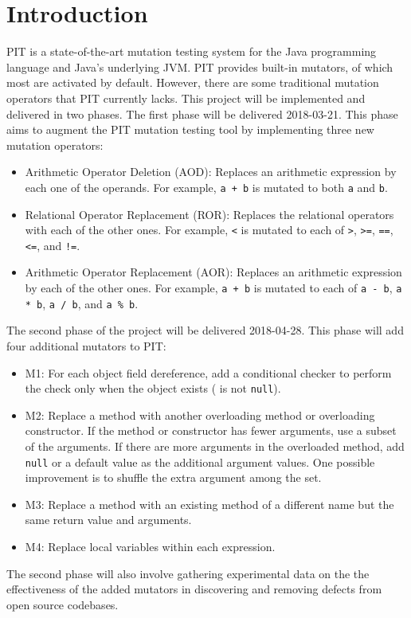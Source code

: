 \section{Introduction}

PIT is a state-of-the-art mutation testing system for the Java programming language and Java’s underlying JVM.
PIT provides built-in mutators, of which most are activated by default.
However, there are some traditional mutation operators that PIT currently lacks.
This project will be implemented and delivered in two phases.
The first phase will be delivered 2018-03-21.
This phase aims to augment the PIT mutation testing tool by implementing three new mutation operators:
\begin{itemize}
\item
  Arithmetic Operator Deletion (AOD):
  Replaces an arithmetic expression by each one of the operands.
  For example, \texttt{a + b} is mutated to both \texttt{a} and \texttt{b}.
\item
  Relational Operator Replacement (ROR):
  Replaces the relational operators with each of the other ones.
  For example, \texttt{<} is mutated to each of \texttt{>}, \texttt{>=}, \texttt{==}, \texttt{<=}, and \texttt{!=}.
\item
  Arithmetic Operator Replacement (AOR):
  Replaces an arithmetic expression by each of the other ones.
  For example, \texttt{a + b} is mutated to each of \texttt{a - b}, \texttt{a * b}, \texttt{a / b}, and \texttt{a \% b}.
\end{itemize}

The second phase of the project will be delivered 2018-04-28.  This phase will add four additional mutators to PIT:
\begin{itemize}
\item
  M1:
  For each object field dereference, add a conditional checker to perform the check only when the object exists (\ie{} is not \texttt{null}).
\item
  M2:
  Replace a method with another overloading method or overloading constructor.
  If the method or constructor has fewer arguments, use a subset of the arguments.
  If there are more arguments in the overloaded method, add \texttt{null} or a default value as the additional argument values.
  One possible improvement is to shuffle the extra argument among the set.
\item
  M3:
  Replace a method with an existing method of a different name but the same return value and arguments.
\item
  M4:
  Replace local variables within each expression.
\end{itemize}

The second phase will also involve gathering experimental data on the the effectiveness of the added mutators in discovering and removing defects from open source codebases.
